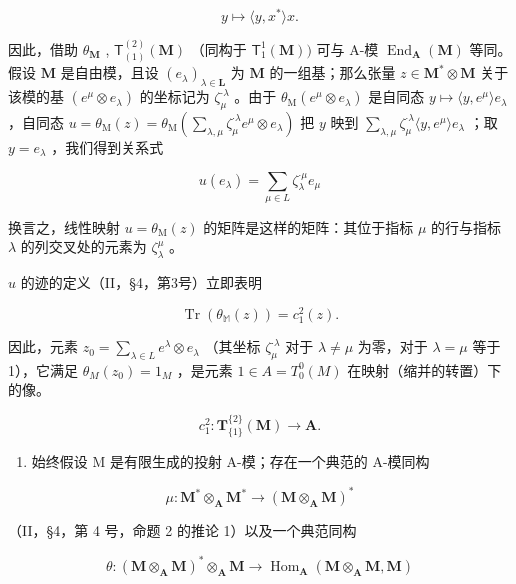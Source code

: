 \[
y \mapsto \langle y, x ^ {*} \rangle x.
\]

因此，借助 \(\theta_{\mathbf{M}}\) , \(\mathsf{T}_{(1)}^{(2)}(\mathbf{M})\) （同构于 \(\mathsf{T}_1^1 (\mathbf{M}))\) 可与 A-模 \(\operatorname{End}_{\mathbf{A}}(\mathbf{M})\) 等同。假设 \(\mathbf{M}\) 是自由模，且设 \((e_{\lambda})_{\lambda \in \mathbf{L}}\) 为 \(\mathbf{M}\) 的一组基；那么张量 \(z\in \mathbf{M}^*\otimes \mathbf{M}\) 关于该模的基 \((e^{\mu}\otimes e_{\lambda})\) 的坐标记为 \(\zeta_{\mu}^{\cdot \lambda}\) 。由于 \(\theta_{\mathrm{M}}(e^{\mu}\otimes e_{\lambda})\) 是自同态 \(y\mapsto \langle y,e^{\mu}\rangle e_{\lambda}\) ，自同态 \(u = \theta_{\mathrm{M}}(z) = \theta_{\mathrm{M}}\left(\sum_{\lambda ,\mu}\zeta_{\mu}^{\cdot \lambda}e^{\mu}\otimes e_{\lambda}\right)\) 把 \(y\) 映到 \(\sum_{\lambda ,\mu}\zeta_{\mu}^{\cdot \lambda}\langle y,e^{\mu}\rangle e_{\lambda}\) ；取 \(y = e_{\lambda}\) ，我们得到关系式

\[
u (e _ {\lambda}) = \sum_ {\mu \in L} \zeta_ {\lambda} ^ {\cdot \mu} e _ {\mu}\tag{18}
\]

换言之，线性映射 \(u = \theta_{\mathrm{M}}(z)\) 的矩阵是这样的矩阵：其位于指标 \(\mu\) 的行与指标 \(\lambda\) 的列交叉处的元素为 \(\zeta_{\lambda}^{\mu}\) 。

\(u\) 的迹的定义（II，§4，第3号）立即表明

\[
\operatorname{Tr} (\theta_ {\mathbb {M}} (z)) = c _ {1} ^ {2} (z).
\]

因此，元素 \(z_0 = \sum_{\lambda \in L} e^\lambda \otimes e_\lambda\) （其坐标 \(\zeta_\mu^{\cdot \lambda}\) 对于 \(\lambda \neq \mu\) 为零，对于 \(\lambda = \mu\) 等于1），它满足 \(\theta_M(z_0) = 1_M\) ，是元素 \(1 \in A = T_0^0(M)\) 在映射（缩并的转置）下的像。

\[
c _ {1} ^ {2}: \mathbf {T} _ {\{1 \}} ^ {\{2 \}} (\mathbf {M}) \rightarrow \mathbf {A}.
\]

\begin{enumerate}
\def\labelenumi{(\arabic{enumi})}
\setcounter{enumi}{1}
\tightlist
\item
  始终假设 M 是有限生成的投射 A-模；存在一个典范的 A-模同构
\end{enumerate}

\[
\mu : \mathbf {M} ^ {*} \otimes_ {\mathbf {A}} \mathbf {M} ^ {*} \rightarrow (\mathbf {M} \otimes_ {\mathbf {A}} \mathbf {M}) ^ {*}
\]

（II，§4，第 4 号，命题 2 的推论 1）以及一个典范同构

\[
\theta : (\mathbf {M} \otimes_ {\mathbf {A}} \mathbf {M}) ^ {*} \otimes_ {\mathbf {A}} \mathbf {M} \rightarrow \operatorname{Hom} _ {\mathbf {A}} (\mathbf {M} \otimes_ {\mathbf {A}} \mathbf {M}, \mathbf {M})
\]


